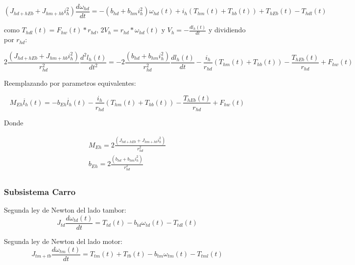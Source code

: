 \documentclass{article}
\begin{document}
            \begin{equation} \label{eq:izajeThdl}
                (J_{hd+hEb} + J_{hm+hb} i_h^2) \frac{d \omega_{hd}}{dt} = - (b_{hd} + b_{hm}i_h^2) \omega_{hd}(t) + i_h (T_{hm}(t) + T_{hb}(t)) + T_{hEb}(t) - T_{hdl}(t)
            \end{equation}

            como $T_{hdl}(t) = F_{hw}(t)*r_{hd}$, $2V_h = r_{hd}*\omega_{hd}(t)$ y $V_h = -\frac{dl_h(t)}{dt}$ y dividiendo por $r_{hd}$:

            \begin{equation} \label{eq:izajeFhw}
                2\frac{(J_{hd+hEb} + J_{hm+hb} i_h^2)}{r_{hd}^2} \frac{d^2 l_h(t)}{dt^2} = - 2\frac{(b_{hd} + b_{hm}i_h^2)}{r_{hd}^2} \frac{d l_h(t)}{dt} - \frac{i_h}{r_{hd}} (T_{hm}(t) + T_{hb}(t)) - \frac{T_{hEb}(t)}{r_{hd}} + F_{hw}(t)
            \end{equation}
            
            Reemplazando por parametros equivalentes:
            
            \begin{equation} \label{eq:izajeEquiv}
                M_{Eh} \ddot{l_h}(t) = - b_{Eh} \dot{l_h}(t) - \frac{i_h}{r_{hd}} (T_{hm}(t) + T_{hb}(t)) - \frac{T_{hEb}(t)}{r_{hd}} + F_{hw}(t)
            \end{equation}

            Donde

            \begin{align} \label{eq:izajeParamsEquiv}
                M_{Eh} = 2\frac{(J_{hd+hEb} + J_{hm+hb} i_h^2)}{r_{hd}^2}\\
                b_{Eh} = 2\frac{(b_{hd} + b_{hm}i_h^2)}{r_{hd}^2}\\
            \end{align}
            

        \subsubsection{Subsistema Carro}
            Segunda ley de Newton del lado tambor:
            \begin{equation} \label{eq:tamborCarro}
                J_{td} \frac{d \omega_{td}(t)}{dt} = T_{td}(t) - b_{td} \omega_{td}(t) - T_{tdl}(t)
            \end{equation}

            Segunda ley de Newton del lado motor:
            \begin{equation} \label{eq:motorCarro}
                J_{tm+tb} \frac{d \omega_{tm}(t)}{dt} = T_{tm}(t) + T_{tb}(t) - b_{tm} \omega_{tm}(t) - T_{tml}(t)
            \end{equation}
\end{document}
